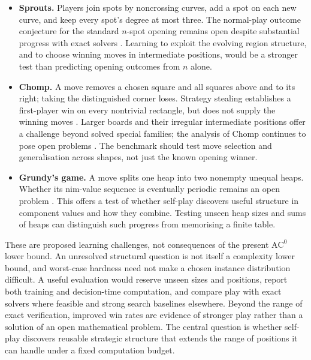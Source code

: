 \documentclass[11pt]{article}
\newcommand{\AC}{\mathrm{AC}}
\theoremstyle{plain}
\theoremstyle{definition}
\theoremstyle{remark}
\numberwithin{equation}{section}
\begin{document}
\begin{itemize}[leftmargin=*]
\item \textbf{Sprouts.} Players join spots by noncrossing curves, add a spot on each new curve, and keep every spot's degree at most three. The normal-play outcome conjecture for the standard $n$-spot opening remains open despite substantial progress with exact solvers \cite{cizek2026sprouts}. Learning to exploit the evolving region structure, and to choose winning moves in intermediate positions, would be a stronger test than predicting opening outcomes from $n$ alone.
\item \textbf{Chomp.} A move removes a chosen square and all squares above and to its right; taking the distinguished corner loses. Strategy stealing establishes a first-player win on every nontrivial rectangle, but does not supply the winning moves \cite{berlekamp2001winningways}. Larger boards and their irregular intermediate positions offer a challenge beyond solved special families; the analysis of Chomp continues to pose open problems \cite{nowakowski2025unsolved}. The benchmark should test move selection and generalisation across shapes, not just the known opening winner.
\item \textbf{Grundy's game.} A move splits one heap into two nonempty unequal heaps. Whether its nim-value sequence is eventually periodic remains an open problem \cite{nowakowski2025unsolved}. This offers a test of whether self-play discovers useful structure in component values and how they combine. Testing unseen heap sizes and sums of heaps can distinguish such progress from memorising a finite table.
\end{itemize}

These are proposed learning challenges, not consequences of the present $\AC^0$ lower bound. An unresolved structural question is not itself a complexity lower bound, and worst-case hardness need not make a chosen instance distribution difficult. A useful evaluation would reserve unseen sizes and positions, report both training and decision-time computation, and compare play with exact solvers where feasible and strong search baselines elsewhere. Beyond the range of exact verification, improved win rates are evidence of stronger play rather than a solution of an open mathematical problem. The central question is whether self-play discovers reusable strategic structure that extends the range of positions it can handle under a fixed computation budget.
\end{document}
